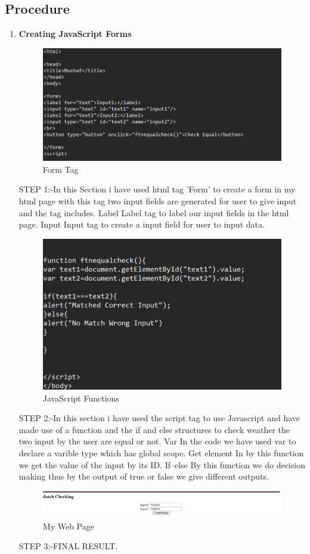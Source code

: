 \documentclass[a4paper,9pt]{article}
\begin{document}
\subsection{Procedure}
\begin{enumerate}
	\item \textbf{Creating JavaScript Forms}
	
	\begin{figure}[H]
		\centering
		\includegraphics[width=0.8\linewidth]{9.1.png}
		\caption{Form Tag }
	\end{figure}
	STEP 1:-In this Section i have used html tag ’Form’ to create a form in my html page with this tag two input fields are
	generated for user to give input and the tag includes.
	Label
	Label tag to label our input fields in the html page.
	Input
	Input tag to create a input field for user to input data.
	\begin{figure}[H]
		\centering
		\includegraphics[width=0.8\linewidth]{9.2.png}
		\caption{JavaScript Functions}
	\end{figure}
	STEP 2:-In this section i have used the script tag to use Javascript and have made use of a function and the if and else
	structures to check weather the two input by the user are equal or not.
	Var
	In the code we have used var to declare a varible type which has global scope.
	Get element
	In by this function we get the value of the input by its ID.
	If–else
	By this function we do decision making thus by the output of true or false we give different outputs.
	
	\begin{figure}[H]
		\centering
		\includegraphics[width=0.8\linewidth]{9.3.png}
		\caption{My Web Page}
	\end{figure}
	STEP 3:-FINAL RESULT.
	
\end{enumerate}
\end{document}
